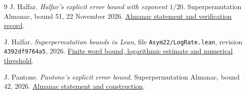\documentclass[11pt]{article}
\begin{document}
\begin{thebibliography}{9}
J. Halfar.
\emph{Halfar's explicit error bound with exponent \(1/20\)}.
Superpermutation Almanac, bound 51, 22 November 2026.
\href{https://superpermutations.com/b/51}{Almanac statement and verification record}.

J. Halfar.
\emph{Superpermutation bounds in Lean}, file \texttt{Asym22/LogRate.lean},
revision \texttt{4392df9764a5}, 2026.
\href{https://github.com/jhalfar/superpermutation-almanac-lean/blob/4392df9764a5be7e5bd4dc15a414defe94077eaf/lean/Asym22/LogRate.lean}{Finite word bound, logarithmic estimate and numerical threshold}.

J. Pantone.
\emph{Pantone's explicit error bound}.
Superpermutation Almanac, bound 42, 2026.
\href{https://superpermutations.com/b/42}{Almanac statement and construction}.
\end{thebibliography}
\end{document}
